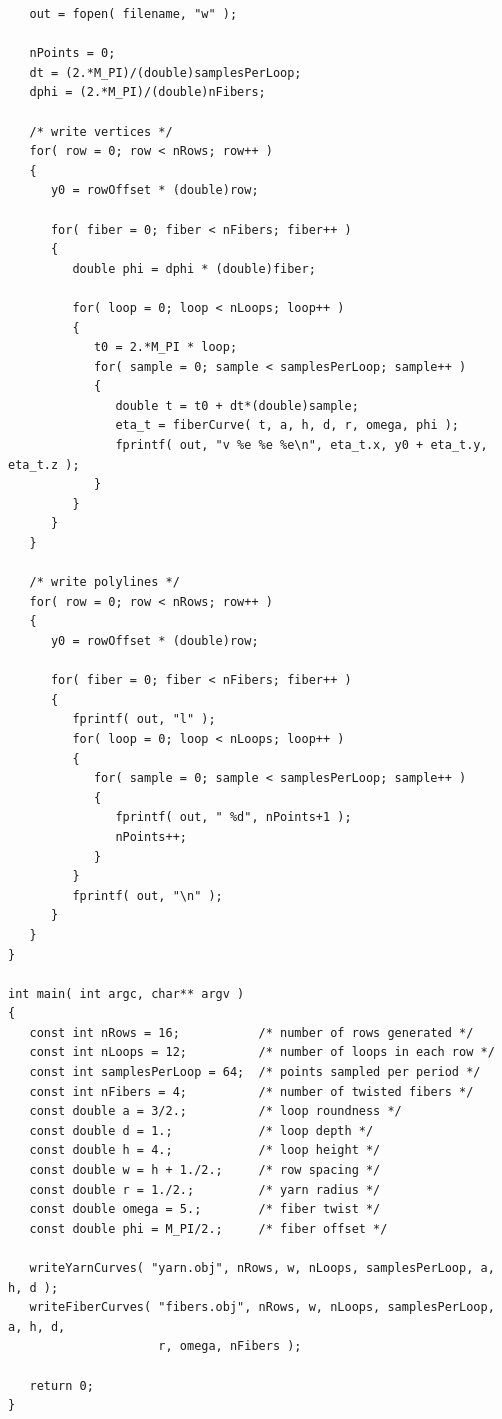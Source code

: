 \documentclass{article}
\begin{document}
\begin{verbatim}
   out = fopen( filename, "w" );

   nPoints = 0;
   dt = (2.*M_PI)/(double)samplesPerLoop;
   dphi = (2.*M_PI)/(double)nFibers;

   /* write vertices */
   for( row = 0; row < nRows; row++ )
   {
      y0 = rowOffset * (double)row;

      for( fiber = 0; fiber < nFibers; fiber++ )
      {
         double phi = dphi * (double)fiber;

         for( loop = 0; loop < nLoops; loop++ )
         {
            t0 = 2.*M_PI * loop;
            for( sample = 0; sample < samplesPerLoop; sample++ )
            {
               double t = t0 + dt*(double)sample;
               eta_t = fiberCurve( t, a, h, d, r, omega, phi );
               fprintf( out, "v %e %e %e\n", eta_t.x, y0 + eta_t.y, eta_t.z );
            }
         }
      }
   }

   /* write polylines */
   for( row = 0; row < nRows; row++ )
   {
      y0 = rowOffset * (double)row;

      for( fiber = 0; fiber < nFibers; fiber++ )
      {
         fprintf( out, "l" );
         for( loop = 0; loop < nLoops; loop++ )
         {
            for( sample = 0; sample < samplesPerLoop; sample++ )
            {
               fprintf( out, " %d", nPoints+1 );
               nPoints++;
            }
         }
         fprintf( out, "\n" );
      }
   }
}

int main( int argc, char** argv )
{
   const int nRows = 16;           /* number of rows generated */
   const int nLoops = 12;          /* number of loops in each row */
   const int samplesPerLoop = 64;  /* points sampled per period */
   const int nFibers = 4;          /* number of twisted fibers */
   const double a = 3/2.;          /* loop roundness */
   const double d = 1.;            /* loop depth */
   const double h = 4.;            /* loop height */
   const double w = h + 1./2.;     /* row spacing */
   const double r = 1./2.;         /* yarn radius */
   const double omega = 5.;        /* fiber twist */
   const double phi = M_PI/2.;     /* fiber offset */

   writeYarnCurves( "yarn.obj", nRows, w, nLoops, samplesPerLoop, a, h, d );
   writeFiberCurves( "fibers.obj", nRows, w, nLoops, samplesPerLoop, a, h, d,
                     r, omega, nFibers );

   return 0;
}

\end{verbatim}

\clearpage
\end{document}
